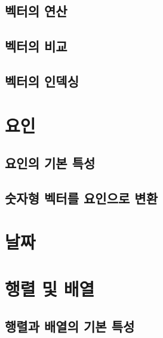 \documentclass[
]{book}
\begin{document}
\hypertarget{uxbca1uxd130uxc758-uxc5f0uxc0b0}{%
\subsection{벡터의 연산}\label{uxbca1uxd130uxc758-uxc5f0uxc0b0}}

\hypertarget{vector-compare}{%
\subsection{벡터의 비교}\label{vector-compare}}

\hypertarget{uxbca1uxd130uxc758-uxc778uxb371uxc2f1}{%
\subsection{벡터의 인덱싱}\label{uxbca1uxd130uxc758-uxc778uxb371uxc2f1}}

\hypertarget{uxc694uxc778}{%
\section{요인}\label{uxc694uxc778}}

\hypertarget{uxc694uxc778uxc758-uxae30uxbcf8-uxd2b9uxc131}{%
\subsection{요인의 기본 특성}\label{uxc694uxc778uxc758-uxae30uxbcf8-uxd2b9uxc131}}

\hypertarget{uxc22buxc790uxd615-uxbca1uxd130uxb97c-uxc694uxc778uxc73cuxb85c-uxbcc0uxd658}{%
\subsection{숫자형 벡터를 요인으로 변환}\label{uxc22buxc790uxd615-uxbca1uxd130uxb97c-uxc694uxc778uxc73cuxb85c-uxbcc0uxd658}}

\hypertarget{uxb0a0uxc9dc}{%
\section{날짜}\label{uxb0a0uxc9dc}}

\hypertarget{uxd589uxb82c-uxbc0f-uxbc30uxc5f4}{%
\section{행렬 및 배열}\label{uxd589uxb82c-uxbc0f-uxbc30uxc5f4}}

\hypertarget{uxd589uxb82cuxacfc-uxbc30uxc5f4uxc758-uxae30uxbcf8-uxd2b9uxc131}{%
\subsection{행렬과 배열의 기본 특성}\label{uxd589uxb82cuxacfc-uxbc30uxc5f4uxc758-uxae30uxbcf8-uxd2b9uxc131}}
\end{document}
